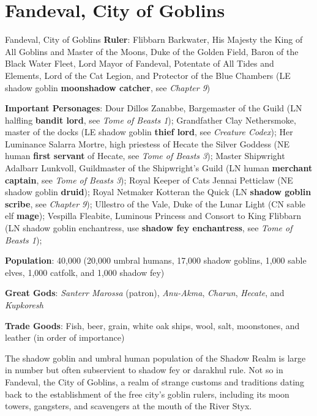 \documentclass[10pt,a4paper,twoside,bg=print,twocolumn,openany,nodeprecatedcode]{dndbook}
\begin{document}
\section{Fandeval, City of Goblins}
\begin{DndSidebar}[float=!b]{Fandeval, City of Goblins}
\textbf{Ruler}: Flibbarn Barkwater, His Majesty the King of All Goblins and Master of the Moons, Duke of the Golden Field, Baron of the Black Water Fleet, Lord Mayor of Fandeval, Potentate of All Tides and Elements, Lord of the Cat Legion, and Protector of the Blue Chambers (LE shadow goblin \textbf{moonshadow catcher}, see \textit{Chapter 9})



\textbf{Important Personages}: Dour Dillos Zanabbe, Bargemaster of the Guild (LN halfling \textbf{bandit lord}, see \textit{Tome of Beasts 1}); Grandfather Clay Nethersmoke, master of the docks (LE shadow goblin \textbf{thief lord}, see \textit{Creature Codex}); Her Luminance Salarra Mortre, high priestess of Hecate the Silver Goddess (NE human \textbf{first servant} of Hecate, see \textit{Tome of Beasts 3}); Master Shipwright Adalbarr Lunkvoll, Guildmaster of the Shipwright's Guild (LN human \textbf{merchant captain}, see \textit{Tome of Beasts 3}); Royal Keeper of Cats Jennai Petticlaw (NE shadow goblin \textbf{druid}); Royal Netmaker Kotteran the Quick (LN \textbf{shadow goblin scribe}, see \textit{Chapter 9}); Ullestro of the Vale, Duke of the Lunar Light (CN sable elf \textbf{mage}); Vespilla Fleabite, Luminous Princess and Consort to King Flibbarn (LN shadow goblin enchantress, use \textbf{shadow fey enchantress}, see \textit{Tome of Beasts 1});



\textbf{Population}: 40,000 (20,000 umbral humans, 17,000 shadow goblins, 1,000 sable elves, 1,000 catfolk, and 1,000 shadow fey)



\textbf{Great Gods}: \textit{Santerr Marossa} (patron), \textit{Anu-Akma}, \textit{Charun}, \textit{Hecate}, and \textit{Kupkoresh}



\textbf{Trade Goods}: Fish, beer, grain, white oak ships, wool, salt, moonstones, and leather (in order of importance)





\end{DndSidebar}

The shadow goblin and umbral human population of the Shadow Realm is large in number but often subservient to shadow fey or darakhul rule. Not so in Fandeval, the City of Goblins, a realm of strange customs and traditions dating back to the establishment of the free city's goblin rulers, including its moon towers, gangsters, and scavengers at the mouth of the River Styx.
\end{document}
